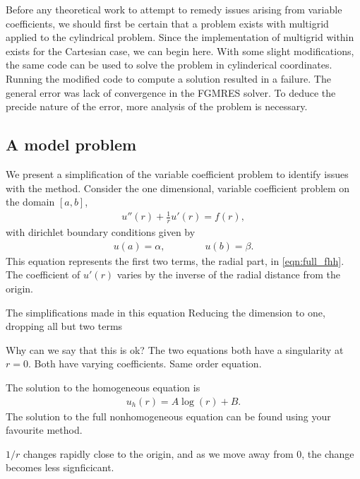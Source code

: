 Before any theoretical work to attempt to remedy issues arising from variable coefficients, we should first be certain that a problem exists with multigrid applied to the cylindrical problem.
Since the implementation of multigrid within \oomph exists for the Cartesian case, we can begin here.
With some slight modifications, the same code can be used to solve the problem in cylinderical coordinates.
Running the modified code to compute a solution resulted in a failure.
The general error was lack of convergence in the FGMRES solver.
To deduce the precide nature of the error, more analysis of the problem is necessary.



\subsection{A model problem}


We present a simplification of the variable coefficient problem to identify issues with the method.
Consider the one dimensional, variable coefficient problem on the domain $\left[a,b\right]$,
\begin{align}
	u''(r) + \frac{1}{r}u'(r) = f(r), \label{eqn:model}
\end{align}
with dirichlet boundary conditions given by
\begin{align}
	u(a)=\alpha, \qquad \qquad u(b)=\beta.
\end{align}
This equation represents the first two terms, the radial part, in \eqref{eqn:full_fhh}.
The coefficient of $u'(r)$ varies by the inverse of the radial distance from the origin.

The simplifications made in this equation
Reducing the dimension to one, dropping all but two terms

Why can we say that this is ok?
The two equations both have a singularity at $r=0$.
Both have varying coefficients.
Same order equation.


The solution to the homogeneous equation is 
\begin{align}
	u_h(r) = A \log(r) + B.
\end{align}
The solution to the full nonhomogeneous equation can be found using your favourite method.

$1/r$ changes rapidly close to the origin, and as we move away from 0, the change becomes less signficicant.

